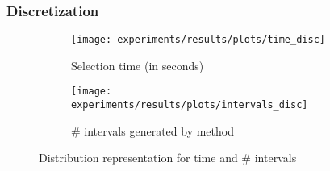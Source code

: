 \documentclass[preprint,12pt]{elsarticle}
\begin{document}
\begin{table}[!htp]
\renewcommand{\arraystretch}{1.3}
\centering
\scriptsize
\caption{Wilcoxon test results and average rankings of methods (Friedman Procedure \& Adjusted p-value with Holm's Test) for accuracy}
\label{tab:wilcoxon-isel}
\end{table}

\subsubsection*{Discretization}

\begin{figure}
\begin{subfigure}{.5\textwidth}
  \centering
  \texttt{[image: experiments/results/plots/time\_disc]}
  \caption{Selection time (in seconds)}
  \label{fig:sfig1}
\end{subfigure}%
\begin{subfigure}{.5\textwidth}
  \centering
  \texttt{[image: experiments/results/plots/intervals\_disc]}
  \caption{\# intervals generated by method}
  \label{fig:sfig2}
\end{subfigure}
\caption{Distribution representation for time and \# intervals}
\label{fig:fig}
\end{figure}
\end{document}
